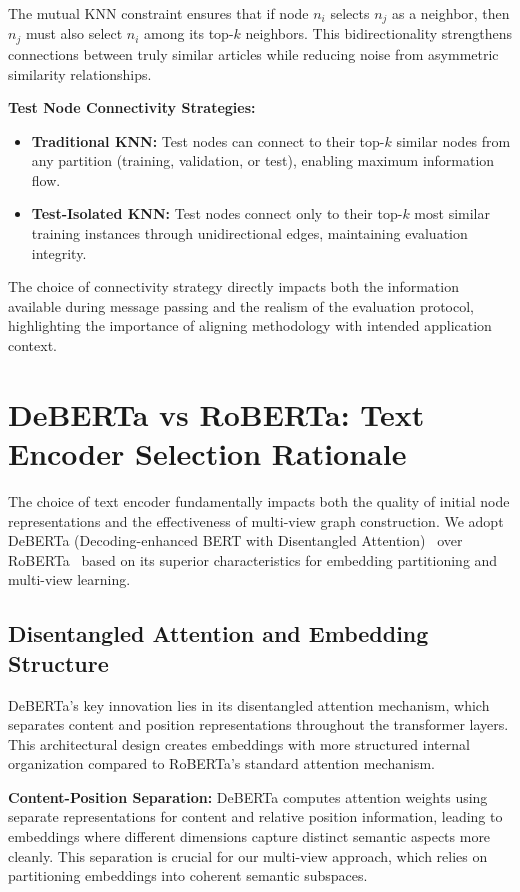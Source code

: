 The mutual KNN constraint ensures that if node $n_i$ selects $n_j$ as a neighbor, then $n_j$ must also select $n_i$ among its top-$k$ neighbors. This bidirectionality strengthens connections between truly similar articles while reducing noise from asymmetric similarity relationships.

\textbf{Test Node Connectivity Strategies:}
\begin{itemize}
    \item \textbf{Traditional KNN:} Test nodes can connect to their top-$k$ similar nodes from any partition (training, validation, or test), enabling maximum information flow.
    \item \textbf{Test-Isolated KNN:} Test nodes connect only to their top-$k$ most similar training instances through unidirectional edges, maintaining evaluation integrity.
\end{itemize}

The choice of connectivity strategy directly impacts both the information available during message passing and the realism of the evaluation protocol, highlighting the importance of aligning methodology with intended application context.

\section{DeBERTa vs RoBERTa: Text Encoder Selection Rationale}

The choice of text encoder fundamentally impacts both the quality of initial node representations and the effectiveness of multi-view graph construction. We adopt DeBERTa (Decoding-enhanced BERT with Disentangled Attention)~\cite{he2021deberta} over RoBERTa~\cite{liu2019roberta} based on its superior characteristics for embedding partitioning and multi-view learning.

\subsection{Disentangled Attention and Embedding Structure}

DeBERTa's key innovation lies in its disentangled attention mechanism, which separates content and position representations throughout the transformer layers. This architectural design creates embeddings with more structured internal organization compared to RoBERTa's standard attention mechanism.

\textbf{Content-Position Separation:} DeBERTa computes attention weights using separate representations for content and relative position information, leading to embeddings where different dimensions capture distinct semantic aspects more cleanly. This separation is crucial for our multi-view approach, which relies on partitioning embeddings into coherent semantic subspaces.

